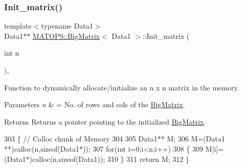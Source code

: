 \subsubsection{\texorpdfstring{Init\+\_\+matrix()}{Init\_matrix()}}
{\footnotesize\ttfamily template$<$typename Data1$>$ \\
Data1$\ast$$\ast$ \hyperlink{classMATOPS_1_1BigMatrix}{M\+A\+T\+O\+P\+S\+::\+Big\+Matrix}$<$ Data1 $>$\+::Init\+\_\+matrix (\begin{DoxyParamCaption}\item[{int}]{n }\end{DoxyParamCaption})\hspace{0.3cm}{\ttfamily [inline]}, {\ttfamily [private]}}



Function to dynamically allocate/initialize an n x n matrix in the memory. 


\begin{DoxyParams}{Parameters}
{\em n} & = No. of rows and cols of the \hyperlink{classMATOPS_1_1BigMatrix}{Big\+Matrix}. \\
\hline
\end{DoxyParams}
\begin{DoxyReturn}{Returns}
Returns a pointer pointing to the initialized \hyperlink{classMATOPS_1_1BigMatrix}{Big\+Matrix}. 
\end{DoxyReturn}

\begin{DoxyCode}
303                         \{   \textcolor{comment}{// Calloc chunk of Memory}
304 
305                                 Data1** M;
306                                 M=(Data1 **)calloc(n,\textcolor{keyword}{sizeof}(Data1*)); 
307                                 \textcolor{keywordflow}{for}(\textcolor{keywordtype}{int} i=0;i<n;i++)
308                                 \{
309                                         M[i]=(Data1*)calloc(n,\textcolor{keyword}{sizeof}(Data1));
310                                 \}
311                                 \textcolor{keywordflow}{return} M;
312                         \}
\end{DoxyCode}
\mbox{\label{classMATOPS_1_1BigMatrix_a43e1704cb38eb6d0121be5b71014eb8e}} 
